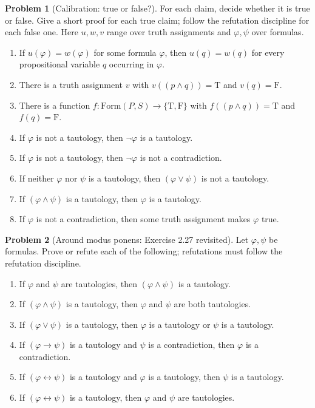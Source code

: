 \documentclass[11pt]{article}
\newcommand{\Form}{\mathrm{Form}}
\newcommand{\T}{\mathrm{T}}
\newcommand{\F}{\mathrm{F}}
\newcommand{\TF}{\{\T,\F\}}
\theoremstyle{definition}
\newtheorem{problem}{Problem}
\begin{document}
\begin{problem}[Calibration: true or false?]
For each claim, decide whether it is true or false. Give a short proof for each
true claim; follow the refutation discipline for each false one. Here $u,w,v$
range over truth assignments and $\varphi,\psi$ over formulas.
\begin{enumerate}
\item[(a)] If $u(\varphi)=w(\varphi)$ for some formula $\varphi$, then
$u(q)=w(q)$ for every propositional variable $q$ occurring in $\varphi$.
\item[(b)] There is a truth assignment $v$ with $v((p\land q))=\T$ and
$v(q)=\F$.
\item[(c)] There is a function $f\colon\Form(P,S)\to\TF$ with $f((p\land q))=\T$
and $f(q)=\F$.
\item[(d)] If $\varphi$ is not a tautology, then $\lnot\varphi$ is a tautology.
\item[(e)] If $\varphi$ is not a tautology, then $\lnot\varphi$ is not a
contradiction.
\item[(f)] If neither $\varphi$ nor $\psi$ is a tautology, then
$(\varphi\lor\psi)$ is not a tautology.
\item[(g)] If $(\varphi\land\psi)$ is a tautology, then $\varphi$ is a tautology.
\item[(h)] If $\varphi$ is not a contradiction, then some truth assignment makes
$\varphi$ true.
\end{enumerate}
\end{problem}

\begin{problem}[Around modus ponens: Exercise 2.27 revisited]
Let $\varphi,\psi$ be formulas. Prove or refute each of the following;
refutations must follow the refutation discipline.
\begin{enumerate}
\item[(a)] If $\varphi$ and $\psi$ are tautologies, then $(\varphi\land\psi)$ is a
tautology.
\item[(b)] If $(\varphi\land\psi)$ is a tautology, then $\varphi$ and $\psi$ are
both tautologies.
\item[(c)] If $(\varphi\lor\psi)$ is a tautology, then $\varphi$ is a tautology or
$\psi$ is a tautology.
\item[(d)] If $(\varphi\to\psi)$ is a tautology and $\psi$ is a contradiction,
then $\varphi$ is a contradiction.
\item[(e)] If $(\varphi\leftrightarrow\psi)$ is a tautology and $\varphi$ is a
tautology, then $\psi$ is a tautology.
\item[(f)] If $(\varphi\leftrightarrow\psi)$ is a tautology, then $\varphi$ and
$\psi$ are tautologies.
\end{enumerate}
\end{problem}
\end{document}
